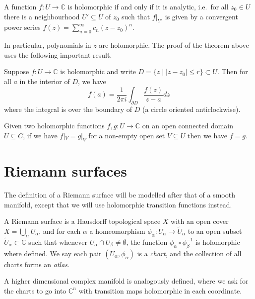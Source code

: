 \begin{theorem}
    A function \(f:U\to \mathbb{C}\) is holomorphic if and only if it is
    analytic, i.e.\ for all \(z_0\in U\) there is a neighbourhood
    \(U'\subseteq U\) of \(z_0\) such that \(f|_{U'}\) is given by a
    convergent power series \(f(z)=\sum_{n=0}^\infty c_n(z-z_0)^n\).
\end{theorem}

In particular, polynomials in \(z\) are holomorphic. The proof of the theorem
above uses the following important result.

\begin{theorem}
    Suppose \(f:U\to \mathbb{C}\) is holomorphic and write \(D=\{z\;|\;
    |z-z_0|\leq r\}\subset U\). Then for all \(a\) in the interior of \(D\), we
    have
    \[
        f(a)=\frac{1}{2\pi i}\int_{\partial D}\frac{f(z)}{z-a}dz
    \]
    where the integral is over the boundary of \(D\) (a circle oriented
    anticlockwise).
\end{theorem}


\begin{corollary}
    Given two holomorphic functions \(f,g:U\to \mathbb{C}\) on an open connected
    domain \(U\subseteq {C}\), if we have \(f|_V=g|_V\) for a non-empty open set
    \(V\subseteq U\) then we have \(f=g\).
\end{corollary}

\section{Riemann surfaces}
The definition of a Riemann surface will be modelled after that of a smooth
manifold, except that we will use holomorphic transition functions instead.
\begin{definition}
    A Riemann surface is a Hausdorff topological space \(X\) with an open cover
    \(X=\bigcup_{\alpha}U_\alpha\), and for each \(\alpha\) a homeomorphism
    \(\phi_\alpha:U_\alpha \to \widetilde{U}_\alpha\) to an open subset
    \(\widetilde{U}_\alpha\subset \mathbb{C}\) such that whenever
    \(U_\alpha\cap U_\beta \neq \emptyset\), the function
    \(\phi_\alpha\circ \phi_\beta^{-1}\) is holomorphic where defined. We say
    each pair \((U_\alpha, \phi_\alpha)\) is a \textit{chart}, and the
    collection of all charts forms an \textit{atlas}.
\end{definition}

\begin{remark}
    A higher dimensional complex manifold is analogously defined, where we ask
    for the charts to go into \(\mathbb{C}^n\) with transition maps holomorphic
    in each coordinate.
\end{remark}

